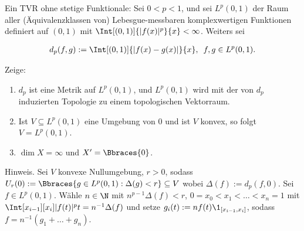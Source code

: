 \begin{exercise}

Ein TVR ohne stetige Funktionale: Sei $0 < p < 1$, und sei $L^p(0, 1)$ der Raum aller (Äquivalenzklassen von) Lebesgue-messbaren komplexwertigen Funktionen definiert auf $(0, 1)$ mit $\Int[(0,1)]{|f(x)|^p}{x} < \infty$.
Weiters sei

\begin{align*}
  d_p(f, g)
  :=
  \Int[(0, 1)]{|f(x) - g(x)|}{x},
  \enspace
  f, g \in L^p(0, 1).
\end{align*}

Zeige:

\begin{enumerate}[label = (\alph*)]

  \item
  $d_p$ ist eine Metrik auf $L^p(0, 1)$, und $L^p(0, 1)$ wird mit der von $d_p$ induzierten Topologie zu einem topologischen Vektorraum.

  \item
  Ist $V \subseteq L^p(0, 1)$ eine Umgebung von $0$ und ist $V$ konvex, so folgt $V = L^p(0, 1)$.

  \item
  $\dim{X} = \infty$ und $X^\prime = \Bbraces{0}$.

\end{enumerate}

Hinweis.
Sei $V$ konvexe Nullumgebung, $r > 0$, sodass $U_r(0) := \Bbraces{g \in L^p(0, 1): \Delta(g) < r} \subseteq V$ wobei $\Delta(f) := d_p(f, 0)$.
Sei $f \in L^p(0, 1)$.
Wähle $n \in \N$ mit $n^{p-1} \Delta(f) < r$, $0 = x_0 < x_1 < \ldots < x_n = 1$ mit $\Int[x_{i-1}][x_i]{|f(t)|^p}{t} = n^{-1} \Delta(f)$ und setze $g_i(t) := n f(t) \1_{[x_{i-1}, x_i]}$, sodass $f = n^{-1}(g_1 + \ldots + g_n)$.

\end{exercise}

